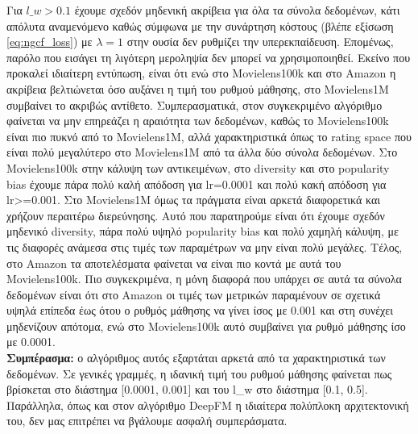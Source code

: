 \noindent Για $ l\_w > 0.1 $ έχουμε σχεδόν μηδενική ακρίβεια για όλα τα σύνολα δεδομένων, κάτι απόλυτα αναμενόμενο καθώς σύμφωνα με την συνάρτηση κόστους (βλέπε εξίσωση \eqref{eq:ngcf_loss}) με $ λ=1 $ στην ουσία δεν ρυθμίζει την υπερεκπαίδευση. Επομένως, παρόλο που εισάγει τη λιγότερη μεροληψία δεν μπορεί να χρησιμοποιηθεί. Εκείνο που προκαλεί ιδιαίτερη εντύπωση, είναι ότι ενώ στο Movielens100k και στο Amazon η ακρίβεια βελτιώνεται όσο αυξάνει η τιμή του ρυθμού μάθησης, στο Movielens1M συμβαίνει το ακριβώς αντίθετο. Συμπερασματικά, στον συγκεκριμένο αλγόριθμο φαίνεται να μην επηρεάζει η αραιότητα των δεδομένων, καθώς το Movielens100k είναι πιο πυκνό από το Movielens1Μ, αλλά χαρακτηριστικά όπως το rating space που είναι πολύ μεγαλύτερο στο Movielens1M από τα άλλα δύο σύνολα δεδομένων. Στο Movielens100k στην κάλυψη των αντικειμένων, στο diversity και στο popularity bias έχουμε πάρα πολύ καλή απόδοση για lr=0.0001 και πολύ κακή απόδοση για lr>=0.001. Στο Movielens1M όμως τα πράγματα είναι αρκετά διαφορετικά και χρήζουν περαιτέρω διερεύνησης. Αυτό που παρατηρούμε είναι ότι έχουμε σχεδόν μηδενικό diversity, πάρα πολύ υψηλό popularity bias και πολύ χαμηλή κάλυψη, με τις διαφορές ανάμεσα στις τιμές των παραμέτρων να μην είναι πολύ μεγάλες. Τέλος, στο Amazon τα αποτελέσματα φαίνεται να είναι πιο κοντά με αυτά του Movielens100k. Πιο συγκεκριμένα, η μόνη διαφορά που υπάρχει σε αυτά τα σύνολα δεδομένων είναι ότι στο Amazon οι τιμές των μετρικών παραμένουν σε σχετικά υψηλά επίπεδα έως ότου ο ρυθμός μάθησης να γίνει ίσος με 0.001 και στη συνέχει μηδενίζουν απότομα, ενώ στο Movielens100k αυτό συμβαίνει για ρυθμό μάθησης ίσο με 0.0001.\\
\textbf{Συμπέρασμα:} ο αλγόριθμος αυτός εξαρτάται αρκετά από τα χαρακτηριστικά των δεδομένων. Σε γενικές γραμμές, η ιδανική τιμή του ρυθμού μάθησης φαίνεται πως βρίσκεται στο διάστημα [0.0001, 0.001] και του l\_w στο διάστημα [0.1, 0.5]. Παράλληλα, όπως και στον αλγόριθμο DeepFM η ιδιαίτερα πολύπλοκη αρχιτεκτονική του, δεν μας επιτρέπει να βγάλουμε ασφαλή συμπεράσματα.
